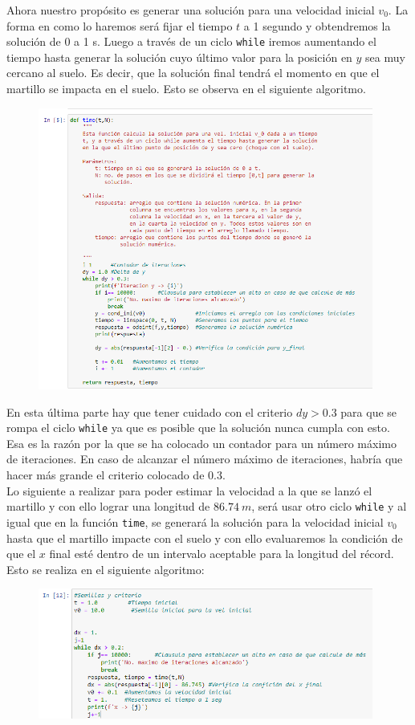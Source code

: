 \documentclass[11pt]{article}
\begin{document}
	Ahora nuestro propósito es generar una solución para una velocidad inicial $v_0$. La forma en como lo haremos será fijar el tiempo $t$ a 1 segundo y obtendremos la solución de 0 a 1 s. Luego a través de un ciclo \texttt{while} iremos aumentando el tiempo hasta generar la solución cuyo último valor para la posición en $y$ sea muy cercano al suelo. Es decir, que la solución final tendrá el momento en que el martillo se impacta en el suelo. Esto se observa en el siguiente algoritmo.
	\begin{figure}[h!]
		\centering
		\includegraphics[width=11cm]{Img/5.PNG}
	\end{figure}
	
\newpage
	En esta última parte hay que tener cuidado con el criterio $dy > 0.3$ para que se rompa el ciclo \texttt{while} ya que es posible que la solución nunca cumpla con esto. Esa es la razón por la que se ha colocado un contador para un número máximo de iteraciones. En caso de alcanzar el número máximo de iteraciones, habría que hacer más grande el criterio colocado de 0.3.\\
	Lo siguiente a realizar para poder estimar la velocidad a la que se lanzó el martillo y con ello lograr una longitud de $\SI{86.74}{m}$, será usar otro ciclo \texttt{while} y al igual que en la función \texttt{time}, se generará la solución para la velocidad inicial $v_0$ hasta que el martillo impacte con el suelo y con ello evaluaremos la condición de que el $x$ final esté dentro de un intervalo aceptable para la longitud del récord. Esto se realiza en el siguiente algoritmo:
	\begin{figure}[h]
		\centering
		\includegraphics[width=11cm]{Img/6.PNG}
	\end{figure}
	
\end{document}
